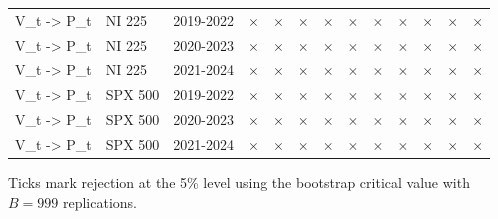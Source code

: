 \begin{table}[htbp]
\begin{tabular}{lllllllllllll}
V\_t -> P\_t & NI 225 & 2019-2022 & $\times$ & $\times$ & $\times$ & $\times$ & $\times$ & $\times$ & $\times$ & $\times$ & $\times$ & $\times$ \\
V\_t -> P\_t & NI 225 & 2020-2023 & $\times$ & $\times$ & $\times$ & $\times$ & $\times$ & $\times$ & $\times$ & $\times$ & $\times$ & $\times$ \\
V\_t -> P\_t & NI 225 & 2021-2024 & $\times$ & $\times$ & $\times$ & $\times$ & $\times$ & $\times$ & $\times$ & $\times$ & $\times$ & $\times$ \\
V\_t -> P\_t & SPX 500 & 2019-2022 & $\times$ & $\times$ & $\times$ & $\times$ & $\times$ & $\times$ & $\times$ & $\times$ & $\times$ & $\times$ \\
V\_t -> P\_t & SPX 500 & 2020-2023 & $\times$ & $\times$ & $\times$ & $\times$ & $\times$ & $\times$ & $\times$ & $\times$ & $\times$ & $\times$ \\
V\_t -> P\_t & SPX 500 & 2021-2024 & $\times$ & $\times$ & $\times$ & $\times$ & $\times$ & $\times$ & $\times$ & $\times$ & $\times$ & $\times$ \\
\bottomrule
\end{tabular}

\begin{minipage}{\linewidth}\footnotesize
Ticks mark rejection at the 5\% level using the bootstrap critical value with $B=999$ replications.
\end{minipage}
\end{table}
